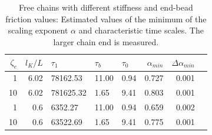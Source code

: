 \documentclass[
    paper=A4,pagesize=automedia,fontsize=12pt,
    BCOR=15mm,DIV=22,
    twoside,headinclude,footinclude=false,
    fleqn,             %
    bibliography=totocnumbered,          %
    listof=totoc,                %
    listof=flat,                 %
    cleardoublepage=empty      %
    numbers=endperiod
]{scrartcl}
\begin{document}
\begin{table}[H]
    \centering
    
    \begin{tabular}{rrlllrrr}
        \toprule
        $\zeta_e$ & $l_K/L$ & $\tau_1$ & $\tau_b$ & $\tau_0$ & $\alpha_{min}$ & $\Delta \alpha_{min}$ \\
        \midrule
        1 & 6.02 & 78162.53 & 11.00 & 0.94 & 0.727 & 0.001\\
        10 & 6.02 & 781625.32 & 1.65 & 9.41 & 0.803 & 0.001\\
        1 & 0.6 & 6352.27 & 11.00 & 0.94 & 0.659 & 0.002\\
        10 & 0.6 & 63522.69 & 1.65 & 9.41 & 0.775 & 0.001\\
        \bottomrule
        \end{tabular}
    \caption{
        Free chains with different stiffness and end-bead friction values: 
        Estimated values of the minimum of the scaling exponent $\alpha$ and
        characteristic time scales. The larger chain end is measured.
    }
    \label{table:free_chain_alpha_estimations}
\end{table}
\end{document}
